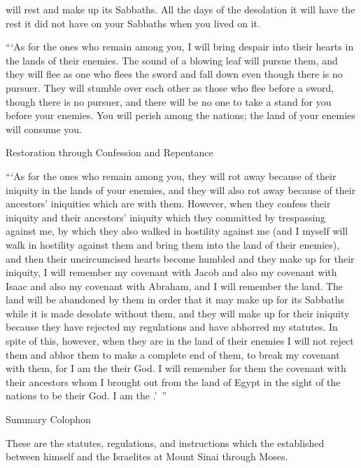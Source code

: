 {will rest
and make up its
Sabbaths.
All
the days
of the desolation
it will have the rest
it did not
have on your Sabbaths
when you lived
on it.
\par }{\PP {}“‘As
for the ones who remain
among you, I will bring
despair
into their hearts
in the lands
of their enemies.
The
sound
of a blowing leaf
will pursue
them, and they will flee
as one who flees
the sword
and fall
down even though there is no
pursuer.
They will stumble
over each
other
as those who flee before
a sword,
though there is no
pursuer,
and there will be
no
one to take a stand
for you before
your enemies.
You will perish
among the nations;
the land
of your enemies
will consume you.
\par }{\SH Restoration through Confession and Repentance
\par }{\PP {}“‘As for the ones who remain
among you, they will rot
away because of their iniquity
in the lands
of your enemies,
and they will also
rot
away because of their ancestors’
iniquities
which are with them.
However, when
they confess
their iniquity
and their ancestors’
iniquity
which
they committed by trespassing
against me, by which
they also walked
in hostility against me
(and
I myself
will walk
in hostility
against them and bring
them into
the land
of their enemies), and then
their uncircumcised
hearts
become humbled
and they make up
for
their iniquity,
I will remember
my covenant
with Jacob
and also
my covenant
with Isaac
and also
my covenant
with Abraham,
and I will remember
the land.
The land
will be abandoned
by them
in order that it may make up for its Sabbaths
while it is made desolate
without them,
and they
will make up
for their iniquity
because
they have
rejected
my regulations
and have abhorred
my statutes.
In spite
of this,
however, when
they are in the land
of their enemies
I will not
reject
them and abhor
them
to make a complete
end of them, to break
my covenant
with
them, for
I am
the {}
their God.
I will remember
for them the covenant
with their ancestors
whom
I brought out
from the
land
of Egypt
in the sight
of the nations
to be
their God.
I am
the {}.’ ”
\par }{\SH Summary Colophon
\par }{\PP {}These
are the statutes,
regulations,
and instructions
which
the {}
established between
himself and the Israelites
at Mount
Sinai
through
Moses.

}
